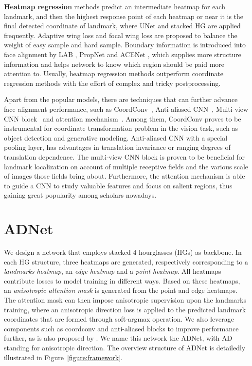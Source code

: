 \documentclass[10pt,twocolumn,letterpaper]{article}
\begin{document}
\noindent\textbf{Heatmap regression} methods \cite{wei2016convolutional,dong2018style,deng2019joint,newell2016stacked,bulat2016convolutional} predict an intermediate heatmap for each landmark, and then the highest response point of each heatmap or near it is the final detected coordinate of landmark, where UNet \cite{ronneberger2015u} and stacked HG \cite{newell2016stacked} are applied frequently. Adaptive wing loss \cite{wang2019adaptive} and focal wing loss \cite{huang2020propagationnet} are proposed to balance the weight of easy sample and hard sample. Boundary information is introduced into face alignment by LAB \cite{wu2018look}, PropNet \cite{huang2020propagationnet} and ACENet \cite{huang2020ace}, which supplies more structure information and helps network to know which region should be paid more attention to. Usually, heatmap regression methods outperform coordinate regression methods with the effort of complex and tricky postprocessing.

Apart from the popular models, there are techniques that can further advance face alignment performance, such as CoordConv~\cite{liu2018intriguing}, Anti-aliased CNN~\cite{zhang2019making}, Multi-view CNN block~\cite{bulat2017binarized} and attention mechanism~\cite{wu2018look}. Among them, CoordConv proves to be instrumental for coordinate transformation problem in the vision task, such as object detection and generative modeling. Anti-aliased CNN with a special pooling layer, has advantages in translation invariance or ranging degrees of translation dependence. The multi-view CNN block is proven to be beneficial for landmark localization on account of multiple receptive fields and the various scale of images those fields bring about. Furthermore, the attention mechanism is able to guide a CNN to study valuable features and focus on salient regions, thus gaining great popularity among scholars nowadays. 

\section{ADNet}
\label{section:ADNet}

We design a network that employs stacked 4 hourglasses (HGs) \cite{bulat2017far} as backbone. In each HG structure, three heatmaps are generated, respectively corresponding to a \emph{landmarks heatmap}, an \emph{edge heatmap} and a \emph{point heatmap}. All heatmaps contribute losses to model training in different ways.
Based on these heatmaps, an \emph{anisotropic attention mask} is generated from the point and edge heatmaps. The attention mask can then impose anisotropic supervision upon the landmarks training, where an anisotropic direction loss is applied to the predicted landmark coordinates that are formed through soft-argmax operation. We also leverage components such as coordconv \cite{liu2018intriguing} and anti-aliased blocks \cite{zhang2019making} to improve performance further, as is also proposed by \cite{huang2020propagationnet}.
We name this network the ADNet, with AD standing for anisotropic direction. The overview structure of ADNet is detailedly illustrated in Figure~\ref{figure:framework}.
\end{document}
